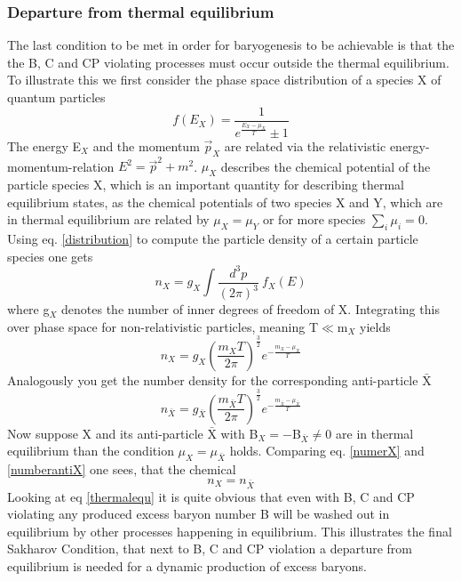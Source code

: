 \subsubsection{Departure from thermal equilibrium}
The last condition to be met in order for baryogenesis to be achievable is that the the B, C and CP violating processes must occur outside the thermal equilibrium. To illustrate this we first consider the phase space distribution of a species X of quantum particles
\begin{equation}
	f(E_X)=\frac{1}{e^{\frac{E_X-\mu_X}{T}}\pm1}
	\label{distribution}
\end{equation}
The energy E$_X$ and the momentum $\vec{p}_X$ are related via the relativistic energy-momentum-relation $E^2=\vec{p}^2+m^2$. $\mu_X$ describes the chemical potential of the particle species X, which is an important quantity for describing thermal equilibrium states, as the chemical potentials of two species X and Y, which are in thermal equilibrium are related by $\mu_X=\mu_Y$ or for more species $\sum_i\mu_i=0$.\newline
Using eq. \ref{distribution} to compute the particle density of a certain particle species one gets 
\begin{equation*}
	n_X=g_X\int\frac{d^3p}{(2\pi)^3}\:f_X(E)
\end{equation*}
where g$_X$ denotes the number of inner degrees of freedom of X. \newline
Integrating this over phase space for non-relativistic particles, meaning T$\ll$m$_X$ yields
\begin{equation}
n_X=g_X\left(\frac{m_XT}{2\pi}\right)^\frac{3}{2}e^{-\frac{m_X-\mu_X}{T}}
\label{numerX}
\end{equation}
Analogously you get the number density for the corresponding anti-particle $\bar{\text{X}}$
\begin{equation}
	n_{\bar{X}}=g_{\bar{X}}\left(\frac{m_{\bar{X}}T}{2\pi}\right)^\frac{3}{2}e^{-\frac{m_{\bar{X}}-\mu_{\bar{X}}}{T}}
\label{numberantiX}
\end{equation}
Now suppose X and its anti-particle $\bar{\text{X}}$  with B$_X=-$B$_{\bar{X}}\neq0$ are in thermal equilibrium than the condition $\mu_X=\mu_{\bar{X}}$ holds. Comparing eq. \ref{numerX} and \ref{numberantiX} one sees, that the chemical %
\begin{equation}
	n_X=n_{\bar{X}}
	\label{thermalequ}
\end{equation}
Looking at eq \ref{thermalequ} it is quite obvious that even with B, C and CP violating any produced excess baryon number B will be washed out in equilibrium by other processes happening in equilibrium. \newline
This illustrates the final Sakharov Condition, that next to B, C and CP violation a departure from equilibrium is needed for a dynamic production of excess baryons.
